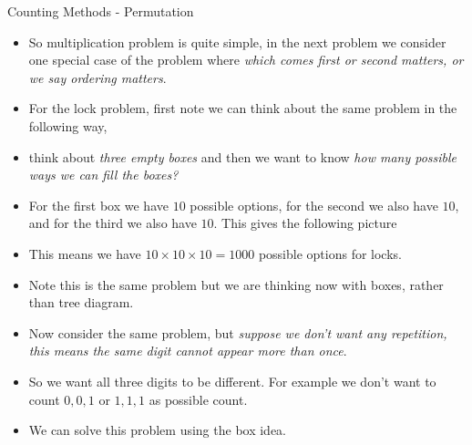 \documentclass[8pt,usepdftitle=false]{beamer}
\begin{document}
\begin{frame}[allowframebreaks]{Counting Methods - Permutation}

\begin{itemize}

\item So multiplication problem is quite simple, in the next problem we consider one special case of the problem where \emph{which comes first or second matters, or we say ordering matters}.

\item For the lock problem, first note we can think about the same problem in the following way, 

\item think about \emph{three empty boxes} and then we want to know \emph{how many possible ways we can fill the boxes?} 

\item For the first box we have $10$ possible options, for the second we also have $10$, and for the third we also have $10$. This gives the following picture 

\vspace*{.3cm}
\begin{figure}
\centering
{}
\end{figure}
\vspace*{.3cm}

\item This means we have $10 \times 10 \times 10 = 1000$ possible options for locks. 

\item Note this is the same problem but we are thinking now with boxes, rather than tree diagram.

\framebreak



\item Now consider the same problem, but \emph{suppose we don't want any repetition, this means the same digit cannot appear more than once}. 

\item So we want all three digits to be different. For example we don't want to count $0,0,1$ or $1, 1, 1$ as possible count.

\item We can solve this problem using the box idea.


\end{itemize}
\end{frame}
\end{document}
